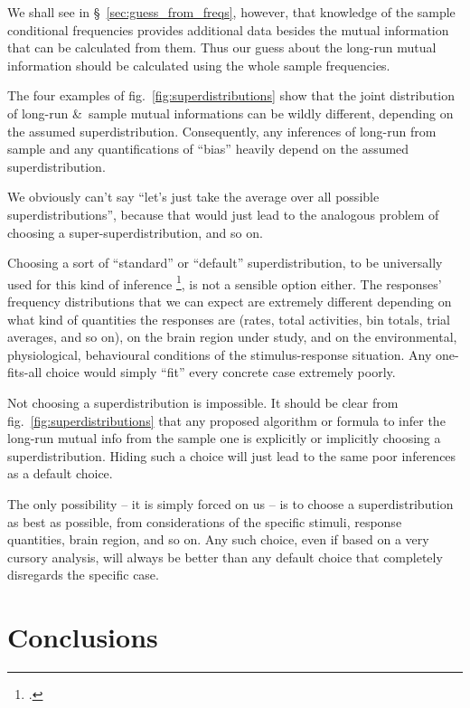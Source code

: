 \documentclass[\ifafour a4paper,12pt,\else a5paper,10pt,\fi%
onecolumn,oneside,article,%
british%
]{memoir}
\theoremstyle{remark}
\theoremstyle{innote}
\newcommand*{\citep}{\footcites}
\newcommand*{\amp}{\&}
\renewcommand*{\|}[1][]{\nonscript\,#1\vert\nonscript\;\mathopen{}}
\renewcommand*{\=}{\TextOrMath\texteq\eq}
\newcommand*{\sect}{\S}%
\newcommand*{\fig}{fig.}%
\newcommand*{\cf}{{cf.}}
\begin{document}
We shall see in \sect~\ref{sec:guess_from_freqs}, however, that knowledge
of the sample conditional frequencies provides additional data besides the
mutual information that can be calculated from them. Thus our guess about
the long-run mutual information should be calculated using the whole sample
frequencies.

The four examples of \fig~\ref{fig:superdistributions} show that the joint
distribution of long-run \amp\ sample mutual informations can be wildly
different, depending on the assumed superdistribution. Consequently, any
inferences of long-run from sample and any quantifications of
\enquote{bias} heavily depend on the assumed superdistribution.

\medskip

We obviously can't say \enquote{let's just take the average over all
  possible superdistributions}, because that would just lead to the
analogous problem of choosing a super-superdistribution, and so on.

Choosing a sort of \enquote{standard} or \enquote{default}
superdistribution, to be universally used for this kind of inference
\citep[\cf][]{nemenmanetal2004}, is not a sensible option either. The
responses' frequency distributions that we can expect are extremely
different depending on what kind of quantities the responses are (rates,
total activities, bin totals, trial averages, and so on), on the brain
region under study, and on the environmental, physiological, behavioural
conditions of the stimulus-response situation. Any one-fits-all choice
would simply \enquote{fit} every concrete case extremely poorly.

Not choosing a superdistribution is impossible. It should be clear from
\fig~\ref{fig:superdistributions} that any proposed algorithm or formula to
infer the long-run mutual info from the sample one is explicitly or
implicitly choosing a superdistribution. Hiding such a choice will just
lead to the same poor inferences as a default choice.

The only possibility -- it is simply forced on us -- is to choose a
superdistribution as best as possible, from considerations of the specific
stimuli, response quantities, brain region, and so on. Any such choice,
even if based on a very cursory analysis, will always be better than any
default choice that completely disregards the specific case.

\section{Conclusions}
\label{sec:conclusions}
\end{document}
